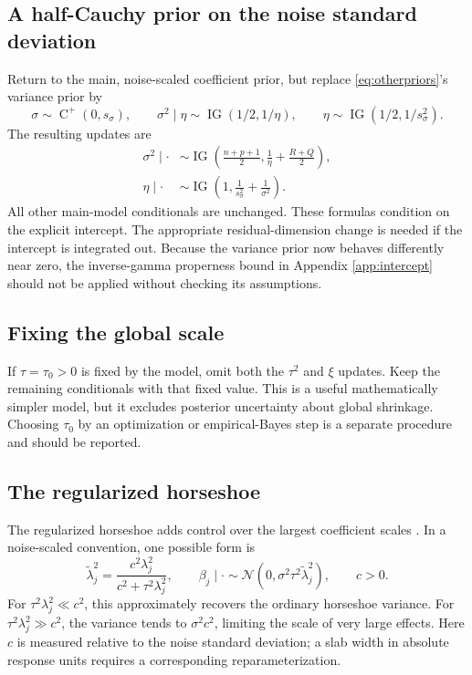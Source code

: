 \documentclass[11pt,letterpaper]{article}
\numberwithin{equation}{section}
\newcommand{\IG}{\operatorname{IG}}
\newcommand{\HC}{\operatorname{C}^{+}}
\newcommand{\Normal}{\mathcal{N}}
\newcommand{\given}{\mid}
\begin{document}
\subsection{A half-Cauchy prior on the noise standard deviation}

Return to the main, noise-scaled coefficient prior, but replace
\eqref{eq:otherpriors}'s variance prior by
\[
 \sigma\sim\HC(0,s_\sigma),\qquad
 \sigma^2\given\eta\sim\IG(1/2,1/\eta),\qquad
 \eta\sim\IG(1/2,1/s_\sigma^2).
\]
The resulting updates are
\begin{align}
 \sigma^2\given\cdot&\sim
 \IG\left(\frac{n+p+1}{2},\frac1\eta+\frac{R+Q}{2}\right),\\
 \eta\given\cdot&\sim\IG\left(1,\frac1{s_\sigma^2}+\frac1{\sigma^2}\right).
\end{align}
All other main-model conditionals are unchanged. These formulas condition on
the explicit intercept. The appropriate residual-dimension change is needed
if the intercept is integrated out. Because the variance prior now behaves
differently near zero, the inverse-gamma properness bound in Appendix
\ref{app:intercept} should not be applied without checking its assumptions.

\subsection{Fixing the global scale}

If \(\tau=\tau_0>0\) is fixed by the model, omit both the \(\tau^2\) and
\(\xi\) updates. Keep the remaining conditionals with that fixed value.
This is a useful mathematically simpler model, but it excludes posterior
uncertainty about global shrinkage. Choosing \(\tau_0\) by an optimization
or empirical-Bayes step is a separate procedure and should be reported.

\subsection{The regularized horseshoe}

The regularized horseshoe adds control over the largest coefficient scales
\cite{piironen2017}. In a noise-scaled convention, one possible form is
\begin{equation}
 \widetilde\lambda_j^2
  =\frac{c^2\lambda_j^2}{c^2+\tau^2\lambda_j^2},\qquad
 \beta_j\given\cdot\sim
 \Normal(0,\sigma^2\tau^2\widetilde\lambda_j^2),\qquad c>0.
\end{equation}
For \(\tau^2\lambda_j^2\ll c^2\), this approximately recovers the ordinary
horseshoe variance. For \(\tau^2\lambda_j^2\gg c^2\), the variance tends
to \(\sigma^2c^2\), limiting the scale of very large effects. Here \(c\)
is measured relative to the noise standard deviation; a slab width in
absolute response units requires a corresponding reparameterization.
\end{document}
